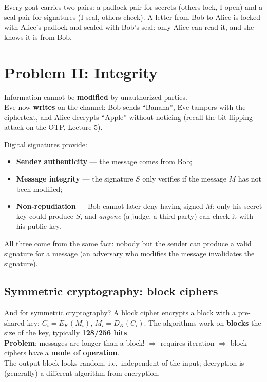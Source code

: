 \begin{goatbox}
Every goat carries two pairs: a padlock pair for secrets (others lock, I open) and a seal pair for
signatures (I seal, others check). A letter from Bob to Alice is locked with Alice's padlock and
sealed with Bob's seal: only Alice can read it, and she knows it is from Bob.
\end{goatbox}

\section{Problem II: Integrity}

\begin{defnbox}[title=Integrity]
Information cannot be \textbf{modified} by unauthorized parties. \\
Eve now \textbf{writes} on the channel: Bob sends ``Banana'', Eve tampers with the
ciphertext, and Alice decrypts ``Apple'' without noticing (recall the bit-flipping attack
on the OTP, Lecture 5).
\end{defnbox}

\begin{propbox}[title=Message integrity through digital signatures]
Digital signatures provide:
\begin{itemize}
  \item \textbf{Sender authenticity} --- the message comes from Bob;
  \item \textbf{Message integrity} --- the signature $S$ only verifies if the message $M$
        has not been modified;
  \item \textbf{Non-repudiation} --- Bob cannot later deny having signed $M$: only his
        secret key could produce $S$, and \emph{anyone} (a judge, a third party) can
        check it with his public key.
\end{itemize}
All three come from the same fact: nobody but the sender can produce a valid signature for a
message (an adversary who modifies the message invalidates the signature).
\end{propbox}

\subsection{Symmetric cryptography: block ciphers}

\begin{defnbox}[title=Block cipher]
And for symmetric cryptography? A block cipher encrypts a block with a pre-shared key:
$C_i = E_K(M_i)$, $M_i = D_K(C_i)$. The algorithms work on \textbf{blocks} the size of the
key, typically \textbf{128/256 bits}. \\
\textbf{Problem}: messages are longer than a block! $\Rightarrow$ requires iteration
$\Rightarrow$ block ciphers have a \textbf{mode of operation}. \\
The output block looks random, i.e.\ independent of the input; decryption is (generally) a
different algorithm from encryption.
\end{defnbox}

